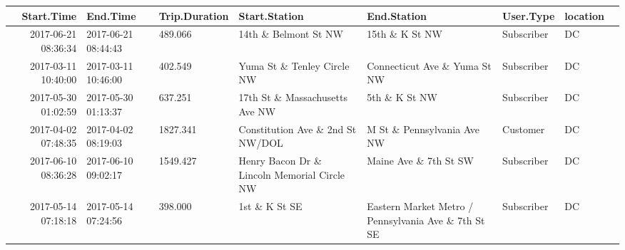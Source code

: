 \documentclass[11pt]{article}
\begin{document}
    \begin{tabular}{r|lllllll}
 Start.Time & End.Time & Trip.Duration & Start.Station & End.Station & User.Type & location\\
\hline
	 2017-06-21 08:36:34                                   & 2017-06-21 08:44:43                                   &  489.066                                              & 14th \& Belmont St NW                                & 15th \& K St NW                                      & Subscriber                                            & DC                                                   \\
	 2017-03-11 10:40:00                                   & 2017-03-11 10:46:00                                   &  402.549                                              & Yuma St \& Tenley Circle NW                          & Connecticut Ave \& Yuma St NW                        & Subscriber                                            & DC                                                   \\
	 2017-05-30 01:02:59                                   & 2017-05-30 01:13:37                                   &  637.251                                              & 17th St \& Massachusetts Ave NW                      & 5th \& K St NW                                       & Subscriber                                            & DC                                                   \\
	 2017-04-02 07:48:35                                   & 2017-04-02 08:19:03                                   & 1827.341                                              & Constitution Ave \& 2nd St NW/DOL                    & M St \& Pennsylvania Ave NW                          & Customer                                              & DC                                                   \\
	 2017-06-10 08:36:28                                   & 2017-06-10 09:02:17                                   & 1549.427                                              & Henry Bacon Dr \& Lincoln Memorial Circle NW         & Maine Ave \& 7th St SW                               & Subscriber                                            & DC                                                   \\
	 2017-05-14 07:18:18                                   & 2017-05-14 07:24:56                                   &  398.000                                              & 1st \& K St SE                                       & Eastern Market Metro / Pennsylvania Ave \& 7th St SE & Subscriber                                            & DC                                                   \\
\end{tabular}
\end{document}
